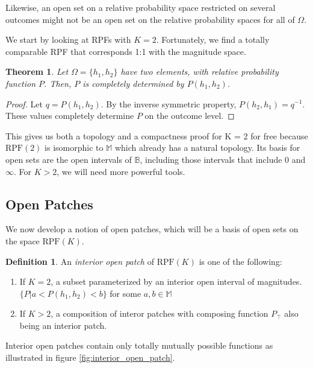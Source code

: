 \documentclass[twoside]{article}
\theoremstyle{plain}%
\newtheorem{theorem}{Theorem}[section]
\theoremstyle{definition}
\newtheorem{definition}{Definition}[section]
\theoremstyle{remark}
\begin{document}
Likewise, an open set on a relative probability space restricted on several outcomes might not be an open set on the relative probability spaces for all of \(\Omega\).

We start by looking at RPFs with \(K = 2\). Fortunately, we find a totally comparable RPF that corresponds 1:1 with the magnitude space.

\begin{theorem}
Let \(\Omega = \{h_1, h_2\}\) have two elements, with relative probability function \(P\). Then, \(P\) is completely determined by \(P(h_1, h_2)\).
\end{theorem}

\begin{proof}
Let \(q = P(h_1, h_2)\). By the inverse symmetric property, \(P(h_2, h_1) = q^{-1}\). These values completely determine \(P\) on the outcome level.
\end{proof}

This gives us both a topology and a compactness proof for K = 2 for free because \(\text{RPF}(2)\) is isomorphic to \(\mathbb{M}\) which already has a natural topology. Its basis for open sets are the open intervals of \(\mathbb{B}\), including those intervals that include 0 and \(\infty\). For \(K > 2\), we will need more powerful tools.

\subsection{Open Patches}

We now develop a notion of open patches, which will be a basis of open sets on the space \(\text{RPF}(K)\).

\begin{definition}
An \textit{interior open patch} of \(\text{RPF}(K)\) is one of the following:

\begin{enumerate}
  \item If \(K = 2\), a subset parameterized by an interior open interval of magnitudes. \(\{P | a < P(h_1, h_2) < b\}\) for some \(a, b \in \mathbb{M}\) 
  \item If \(K > 2\), a composition of interor patches with composing function \(P_{\top}\) also being an interior patch.
\end{enumerate}
\end{definition}

Interior open patches contain only totally mutually possible functions as illustrated in figure \ref{fig:interior_open_patch}.
\end{document}
